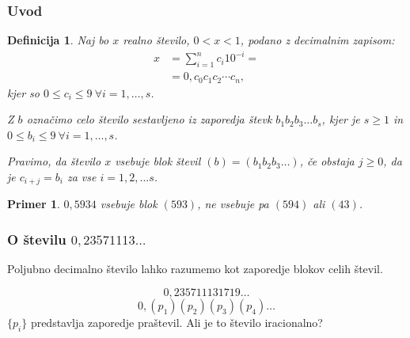 \documentclass{beamer}
\newtheorem{definicija}{Definicija}
\newtheorem{primer}{Primer}
\begin{document}
\begin{frame}
    \frametitle{Uvod}
    \begin{definicija}
        Naj bo $x$ realno število, $ 0 < x < 1$, podano z decimalnim zapisom: 
        \[ 
            \begin{split}
                x & = \sum^n_{i=1} c_i 10^{-i} = \\
                & = 0,c_0c_1c_2 \cdots c_n ,
            \end{split}   
        \]
        kjer so $0 \leq c_i \leq 9 \ \forall i = 1, \dots, s$.
        
        Z $b$ označimo celo število sestavljeno iz zaporedja števk
        $b_1b_2b_3 \dots b_s$, 
        kjer je $s\geq 1$ in $0 \leq b_i \leq 9 \ \forall i = 1, \dots, s$.

        Pravimo, da število $x$ \alert{vsebuje blok števil} $(b) = (b_1b_2b_3 \dots)$, če obstaja $j \geq 0$, da je 
        $c_{i+j} = b_i$ za vse $i=1, 2, \dots s$. 
    \end{definicija}


    \pause
    \begin{primer}
        $0,5934$ vsebuje blok $(593)$, ne vsebuje pa $(594)$ ali $(43)$.
    \end{primer} 


\end{frame}

\begin{frame}
    \frametitle{O številu $0,23571113\dots$}
    Poljubno decimalno število lahko razumemo kot zaporedje blokov celih števil.

    \pause
    \[0,235711131719\dots\]
    \pause
    \[0,(p_1)(p_2)(p_3)(p_4)\dots\]
    $\{p_i\}$ predstavlja zaporedje praštevil.
    \pause
    \newline
    \newline
    Ali je to število iracionalno?

\end{frame}
\end{document}

